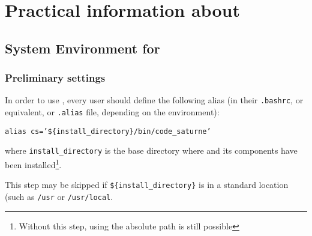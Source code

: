 \section{Practical information about \CS}

\subsection{System Environment for \CS}

\subsubsection{Preliminary settings}
\label{sec:prg_environementCS}

In order to use \CS, every user should define the following alias (in their \texttt{.bashrc},
or equivalent, or \texttt{.alias} file, depending on the environment):
\begin{center}
\texttt{alias cs='\$\{install\_directory\}/bin/code\_saturne'}
\end{center}
where \texttt{install\_directory} is the base directory where
\CS and its components have been installed\footnote{Without this step, using the absolute path is still possible}.

This step may be skipped if \texttt{\$\{install\_directory\}} is in a standard location (such as \texttt{/usr} or \texttt{/usr/local}.


